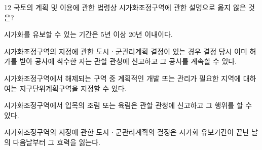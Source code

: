 \begin{question}{12}
국토의 계획 및 이용에 관한 법령상 시가화조정구역에 관한 설명으로 옳지 않은 것은?
\begin{choices}
  \item 시가화를 유보할 수 있는 기간은 5년 이상 20년 이내이다.
  \item 시가화조정구역의 지정에 관한 도시ㆍ군관리계획 결정이 있는 경우 결정 당시 이미 허가를 받아 공사에 착수한 자는 관할 관청에 신고하고 그 공사를 계속할 수 있다.
  \item 시가화조정구역에서 해제되는 구역 중 계획적인 개발 또는 관리가 필요한 지역에 대하여는 지구단위계획구역을 지정할 수 있다.
  \item 시가화조정구역에서 입목의 조림 또는 육림은 관할 관청에 신고하고 그 행위를 할 수 있다.
  \item 시가화조정구역의 지정에 관한 도시ㆍ군관리계획의 결정은 시가화 유보기간이 끝난 날의 다음날부터 그 효력을 잃는다.
\end{choices}
\end{question}
